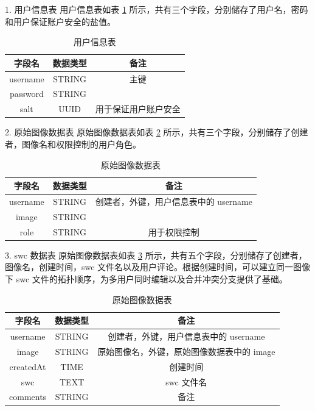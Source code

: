 1. 用户信息表
用户信息表如表 \ref{user-table} 所示，共有三个字段，分别储存了用户名，密码和用户保证账户安全的盐值。
\begin{table}
\centering
\caption{用户信息表}
\begin{tabular}{|c|c|c|}
			   \hline
                 字段名 & 数据类型 & 备注 \\
               \hline
                 username & STRING & 主键 \\
               \hline
                 password & STRING &  \\
               \hline
                 salt & UUID & 用于保证用户账户安全 \\
               \hline
             \end{tabular}
             \label{user-table}    
\end{table}

2. 原始图像数据表
原始图像数据表如表 \ref{image-table} 所示，共有三个字段，分别储存了创建者，图像名和权限控制的用户角色。

\begin{table}
\centering
\caption{原始图像数据表}
\begin{tabular}{|c|c|c|}
			   \hline
                 字段名 & 数据类型 & 备注 \\
               \hline
                 username & STRING & 创建者，外键，用户信息表中的 username \\
               \hline
                 image & STRING &  \\
               \hline
                 role & STRING & 用于权限控制 \\
               \hline
             \end{tabular}
             \label{image-table}    
\end{table}

3. swc 数据表
原始图像数据表如表 \ref{swc-table} 所示，共有五个字段，分别储存了创建者，图像名，创建时间，swc 文件名以及用户评论。根据创建时间，可以建立同一图像下 swc 文件的拓扑顺序，为多用户同时编辑以及合并冲突分支提供了基础。

\begin{table}
\centering
\caption{原始图像数据表}
\begin{tabular}{|c|c|c|}
			   \hline
                 字段名 & 数据类型 & 备注 \\
               \hline
                 username & STRING & 创建者，外键，用户信息表中的 username \\
               \hline
                 image & STRING & 原始图像名，外键，原始图像数据表中的 image \\
               \hline
                 createdAt & TIME & 创建时间 \\
               \hline
                 swc & TEXT & swc 文件名 \\
               \hline
                 comments & STRING & 备注 \\
               \hline
             \end{tabular}
             \label{swc-table}    
\end{table}

